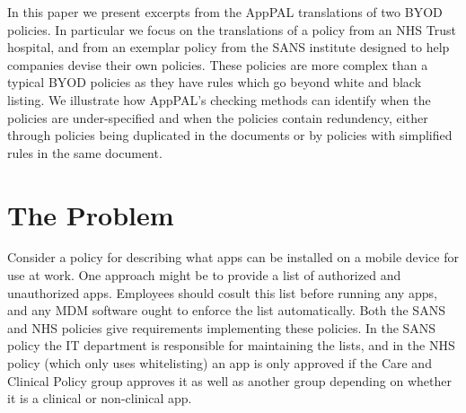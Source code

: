\documentclass[a4paper]{article}
\begin{document}
In this paper we present excerpts from the AppPAL translations of two BYOD policies.
In particular we focus on the translations of a policy from an NHS Trust hospital, and from an exemplar policy from the SANS institute designed to help companies devise their own policies.  These policies are more complex than a typical BYOD policies as they have rules which go beyond white and black listing.  We illustrate how AppPAL's checking methods can identify when the policies are under-specified and when the policies contain redundency, either through policies being duplicated in the documents or by policies with simplified rules in the same document.

\section{The Problem}
\label{sec:problem}

Consider a policy for describing what apps can be installed on a mobile device for use at work.
One approach might be to provide a list of authorized and unauthorized apps.
Employees should cosult this list before running any apps, and any \ac{MDM} software ought to enforce the list automatically.
Both the SANS and NHS policies give requirements implementing these policies.
In the SANS policy the IT department is responsible for maintaining the lists, and in the NHS policy (which only uses whitelisting) an app is only approved if the Care and Clinical Policy group approves it as well as another group depending on whether it is a clinical or non-clinical app.
\end{document}
